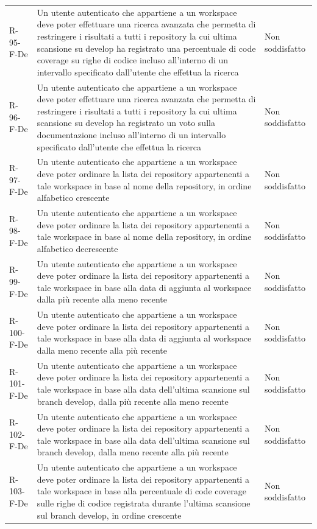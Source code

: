 \documentclass[a4paper, 11pt]{article}
\begin{document}
\begin{longtable}[c]{ >{\centering\arraybackslash}m{2.5cm} >{\centering\arraybackslash}m{8.3cm} >{\centering\arraybackslash}m{3.5cm} }
R-95-F-De & Un utente autenticato che appartiene a un workspace deve poter effettuare una ricerca avanzata che permetta di restringere i risultati a tutti i repository la cui ultima scansione su develop ha registrato una percentuale di code coverage su righe di codice incluso all'interno di un intervallo specificato dall'utente che effettua la ricerca & Non soddisfatto\\
R-96-F-De & Un utente autenticato che appartiene a un workspace deve poter effettuare una ricerca avanzata che permetta di restringere i risultati a tutti i repository la cui ultima scansione su develop ha registrato un voto sulla documentazione incluso all'interno di un intervallo specificato dall'utente che effettua la ricerca & Non soddisfatto\\
R-97-F-De & Un utente autenticato che appartiene a un workspace deve poter ordinare la lista dei repository appartenenti a tale workspace in base al nome della repository, in ordine alfabetico crescente & Non soddisfatto\\
R-98-F-De & Un utente autenticato che appartiene a un workspace deve poter ordinare la lista dei repository appartenenti a tale workspace in base al nome della repository, in ordine alfabetico decrescente & Non soddisfatto\\
R-99-F-De & Un utente autenticato che appartiene a un workspace deve poter ordinare la lista dei repository appartenenti a tale workspace in base alla data di aggiunta al workspace dalla più recente alla meno recente & Non soddisfatto\\
R-100-F-De & Un utente autenticato che appartiene a un workspace deve poter ordinare la lista dei repository appartenenti a tale workspace in base alla data di aggiunta al workspace dalla meno recente alla più recente & Non soddisfatto\\
R-101-F-De & Un utente autenticato che appartiene a un workspace deve poter ordinare la lista dei repository appartenenti a tale workspace in base alla data dell'ultima scansione sul branch develop, dalla più recente alla meno recente & Non soddisfatto\\
R-102-F-De & Un utente autenticato che appartiene a un workspace deve poter ordinare la lista dei repository appartenenti a tale workspace in base alla data dell'ultima scansione sul branch develop, dalla meno recente alla più recente & Non soddisfatto\\
R-103-F-De & Un utente autenticato che appartiene a un workspace deve poter ordinare la lista dei repository appartenenti a tale workspace in base alla percentuale di code coverage sulle righe di codice registrata durante l'ultima scansione sul branch develop, in ordine crescente & Non soddisfatto\\

\end{longtable}
\end{document}
